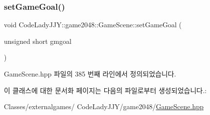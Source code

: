 \subsubsection{\texorpdfstring{set\+Game\+Goal()}{setGameGoal()}}
{\footnotesize\ttfamily void Code\+Lady\+J\+J\+Y\+::game2048\+::\+Game\+Scene\+::set\+Game\+Goal (\begin{DoxyParamCaption}\item[{unsigned short}]{gmgoal }\end{DoxyParamCaption})\hspace{0.3cm}{\ttfamily [inline]}}



Game\+Scene.\+hpp 파일의 385 번째 라인에서 정의되었습니다.



이 클래스에 대한 문서화 페이지는 다음의 파일로부터 생성되었습니다.\+:\begin{DoxyCompactItemize}
\item 
Classes/externalgames/ Code\+Lady\+J\+J\+Y/game2048/\hyperlink{_game_scene_8hpp}{Game\+Scene.\+hpp}\end{DoxyCompactItemize}
